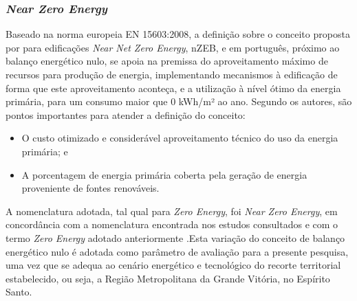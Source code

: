 \subsubsection{\textit{Near Zero Energy}}
 Baseado na norma europeia EN 15603:2008, a definição sobre o conceito proposta por \textcite{Kurnitski2011a} para edificações \textit{Near Net Zero Energy}, nZEB, e em português, próximo ao balanço energético nulo, se apoia na premissa do aproveitamento máximo de recursos para produção de energia, implementando mecanismos à edificação de forma que este aproveitamento aconteça, e a utilização à nível ótimo da energia primária, para um consumo maior que 0 kWh/m² ao ano. Segundo os autores, são pontos importantes para atender a definição do conceito:
    \begin{itemize}
        \item O custo otimizado e considerável aproveitamento técnico do uso da energia primária; e
        \item A porcentagem de energia primária coberta pela geração de energia proveniente de 
        fontes renováveis.
    \end{itemize}
A nomenclatura adotada, tal qual para \textit{Zero Energy}, foi \textit{Near Zero Energy}, em concordância com a nomenclatura encontrada nos estudos consultados e com o termo \textit{Zero Energy} adotado anteriormente \cite{AmericanSocietyofHeatingRefrigeratingandAir-ConditioningEngineers-ASHRAE2019}.Esta variação do conceito de balanço energético nulo é adotada como parâmetro de avaliação para a presente pesquisa, uma vez que se adequa ao cenário energético e tecnológico do recorte territorial estabelecido, ou seja, a Região Metropolitana da Grande Vitória, no Espírito Santo.

